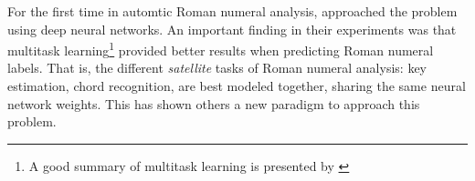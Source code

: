

For the first time in automtic Roman numeral analysis,
\textcite{chen2018functional} approached the problem using
deep neural networks. An important finding in their experiments was that multitask learning\footnote{A good summary of multitask learning is presented by \textcite{ruder2017overview}} provided better results when predicting Roman numeral labels. That is, the different \emph{satellite} tasks of Roman numeral analysis: key estimation, chord recognition, are best modeled together, sharing the same neural network weights. This has shown others a new paradigm to approach this problem.

